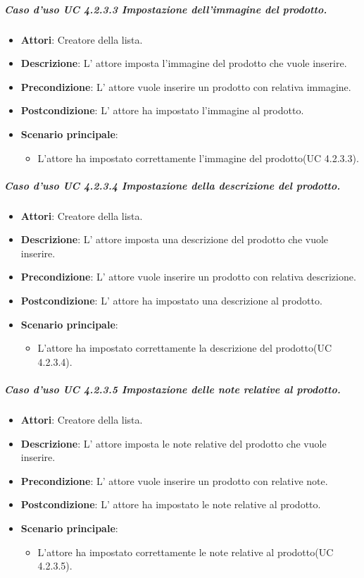 	\subparagraph{Caso d'uso UC 4.2.3.3 Impostazione dell'immagine del prodotto.}
	\begin{itemize}
		\item\textbf{Attori}: Creatore della lista.
		\item\textbf{Descrizione}: L' attore imposta l'immagine del prodotto che vuole inserire.
		\item\textbf{Precondizione}: L' attore vuole inserire un prodotto con relativa immagine.
		\item\textbf{Postcondizione}: L' attore ha impostato l'immagine al prodotto.
		\item\textbf{Scenario principale}:
			\begin{itemize}
				\item L'attore ha impostato correttamente l'immagine del prodotto(UC 4.2.3.3). 
			\end{itemize}
		
	\end{itemize}
	
	\subparagraph{Caso d'uso UC 4.2.3.4 Impostazione della descrizione del prodotto.}
	\begin{itemize}
		\item\textbf{Attori}: Creatore della lista.
		\item\textbf{Descrizione}: L' attore imposta una descrizione del prodotto che vuole inserire.
		\item\textbf{Precondizione}: L' attore vuole inserire un prodotto con relativa descrizione.
		\item\textbf{Postcondizione}: L' attore ha impostato una descrizione al prodotto.
		\item\textbf{Scenario principale}:
			\begin{itemize}
				\item L'attore ha impostato correttamente la descrizione del prodotto(UC 4.2.3.4). 
			\end{itemize}
		
	\end{itemize}
	
	\subparagraph{Caso d'uso UC 4.2.3.5 Impostazione delle note relative al prodotto.}
	\begin{itemize}
		\item\textbf{Attori}: Creatore della lista.
		\item\textbf{Descrizione}: L' attore imposta le note relative del prodotto che vuole inserire.
		\item\textbf{Precondizione}: L' attore vuole inserire un prodotto con relative note.
		\item\textbf{Postcondizione}: L' attore ha impostato le note relative al prodotto.
		\item\textbf{Scenario principale}:
			\begin{itemize}
				\item L'attore ha impostato correttamente le note relative al prodotto(UC 4.2.3.5). 
			\end{itemize}
		
	\end{itemize}
	
